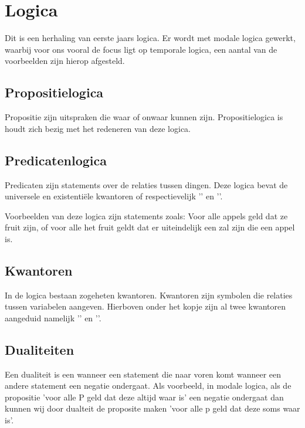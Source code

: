 \documentclass{article}
\begin{document}
\section{Logica}

Dit is een herhaling van eerste jaars logica. Er wordt met modale logica gewerkt, waarbij voor ons vooral de focus ligt op temporale logica, een aantal van de voorbeelden zijn hierop afgesteld.

\subsection{Propositielogica}

Propositie zijn uitspraken die waar of onwaar kunnen zijn. Propositielogica is houdt zich bezig met het redeneren van deze logica.

\subsection{Predicatenlogica} \label{PredicateLogic}

Predicaten zijn statements over de relaties tussen dingen. Deze logica bevat de universele en existentiële kwantoren of respectievelijk '\forall' en '\exists'.

Voorbeelden van deze logica zijn statements zoals: Voor alle appels geld dat ze fruit zijn, of voor alle het fruit geldt dat er uiteindelijk een zal zijn die een appel is.

\subsection{Kwantoren}

In de logica bestaan zogeheten kwantoren. Kwantoren zijn symbolen die relaties tussen variabelen aangeven. Hierboven onder het kopje  zijn al twee kwantoren aangeduid namelijk '\forall' en '\exists'.

\subsection{Dualiteiten}

Een dualiteit is een wanneer een statement die naar voren komt wanneer een andere statement een negatie ondergaat. Als voorbeeld, in modale logica, als de propositie 'voor alle P geld dat deze altijd waar is' een negatie ondergaat dan kunnen wij door dualteit de proposite maken 'voor alle p geld dat deze soms waar is'.
\end{document}
